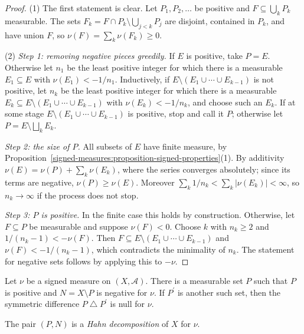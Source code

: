 \begin{proof}
(1) The first statement is clear. Let $P_1, P_2, \ldots$ be positive and $F \subseteq \bigcup_kP_k$ measurable. The sets $F_k = F \cap P_k \setminus \bigcup_{j < k}P_j$ are disjoint, contained in $P_k$, and
have union $F$, so $\nu(F) = \sum_k\nu(F_k) \geq 0$.

(2) \emph{Step 1: removing negative pieces greedily.} If $E$ is positive, take $P = E$. Otherwise let $n_1$ be the least positive integer for which there is a measurable $E_1 \subseteq E$ with
$\nu(E_1) < -1/n_1$. Inductively, if $E \setminus (E_1 \cup \cdots \cup E_{k-1})$ is not positive, let $n_k$ be the least positive integer for which there is a measurable
$E_k \subseteq E \setminus (E_1 \cup \cdots \cup E_{k-1})$ with $\nu(E_k) < -1/n_k$, and choose such an $E_k$. If at some stage $E \setminus (E_1 \cup \cdots \cup E_{k-1})$ is positive, stop and call it
$P$; otherwise let $P = E \setminus \bigsqcup_kE_k$.

\emph{Step 2: the size of $P$.} All subsets of $E$ have finite measure, by Proposition~\ref{signed-measures:proposition-signed-properties}(1). By additivity
$\nu(E) = \nu(P) + \sum_k\nu(E_k)$, where the series converges absolutely; since its terms are negative, $\nu(P) \geq \nu(E)$. Moreover $\sum_k1/n_k < \sum_k|\nu(E_k)| < \infty$, so $n_k \to \infty$
if the process does not stop.

\emph{Step 3: $P$ is positive.} In the finite case this holds by construction. Otherwise, let $F \subseteq P$ be measurable and suppose $\nu(F) < 0$. Choose $k$ with $n_k \geq 2$ and
$1/(n_k - 1) < -\nu(F)$. Then $F \subseteq E \setminus (E_1 \cup \cdots \cup E_{k-1})$ and $\nu(F) < -1/(n_k - 1)$, which contradicts the minimality of $n_k$. The statement for negative sets follows by
applying this to $-\nu$.
\end{proof}

\begin{theorem}\label{signed-measures:theorem-hahn}
Let $\nu$ be a signed measure on $(X, \mathcal{A})$. There is a measurable set $P$ such that $P$ is positive and $N = X \setminus P$ is negative for $\nu$. If $P^{\prime}$ is another such set, then the
symmetric difference $P \mathbin{\triangle} P^{\prime}$ is null for $\nu$.
\end{theorem}

The pair $(P, N)$ is a \emph{Hahn decomposition} of $X$ for $\nu$.

